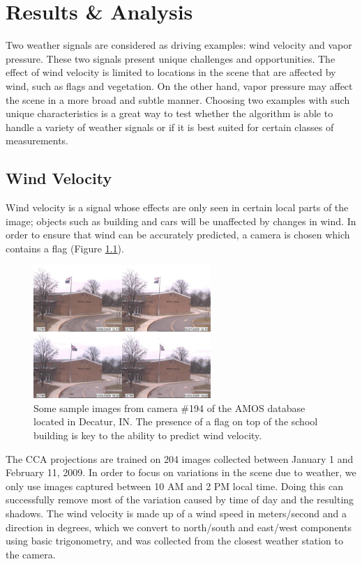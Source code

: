 \chapter{Results \& Analysis}
\label{cpt:results}
Two weather signals are considered as driving examples: wind velocity and vapor pressure. These two signals present unique challenges and opportunities. The effect of wind velocity is limited to locations in the scene that are affected by wind, such as flags and vegetation. On the other hand, vapor pressure may affect the scene in a more broad and subtle manner. Choosing two examples with such unique characteristics is a great way to test whether the algorithm is able to handle a variety of weather signals or if it is best suited for certain classes of measurements.

\section{Wind Velocity}
Wind velocity is a signal whose effects are only seen in certain local parts of the image; objects such as building and cars will be unaffected by changes in wind. In order to ensure that wind can be accurately predicted, a camera is chosen which contains a flag (Figure \ref{fig:windspeedextremes}). 
\begin{figure}
	\centering
		\includegraphics[width=0.60\textwidth]{figures/windspeedextremes.jpg}
	\caption{Some sample images from camera $\#$194 of the AMOS database located in Decatur, IN. The presence of a flag on top of the school building is key to the ability to predict wind velocity.}
	\label{fig:windspeedextremes}
\end{figure}

The CCA projections are trained on 204 images collected between January 1 and February 11, 2009. In order to focus on variations in the scene due to weather, we only use images captured between 10 AM and 2 PM local time. Doing this can successfully remove most of the variation caused by time of day and the resulting shadows. The wind velocity is made up of a wind speed in meters/second and a direction in degrees, which we convert to north/south and east/west components using basic trigonometry, and was collected from the closest weather station to the camera. 

